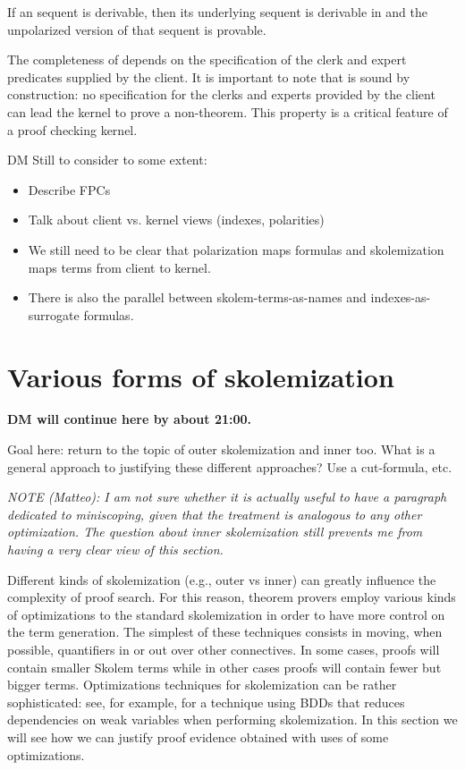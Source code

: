 \documentclass[a4paper,USenglish]{lipics-v2018}
\begin{document}
{\begin{theorem}
  If an \LKFa sequent is derivable, then its underlying sequent is
  derivable in \LKF and the unpolarized version of that sequent is \LK
  provable.
\end{theorem}

\noindent%
The completeness of \LKFa
depends on the specification of the clerk and expert predicates
supplied by the client.
%
It is important to note that \LKFa is sound by construction: no
  specification for the clerks and experts provided by the
  client can lead the kernel to prove a non-theorem.
%
This property is a critical feature of a proof checking kernel.

{\color{red}DM Still to consider to some extent:
  \begin{itemize}
  \item Describe FPCs
  \item Talk about client vs. kernel views (indexes, polarities)
   \item We still need to be clear that polarization maps formulas and
     skolemization maps terms from client to kernel.
     \item There is also the parallel between skolem-terms-as-names
       and indexes-as-surrogate formulas.
  \end{itemize}
}


\section{Various forms of skolemization}
\label{sec:deskolem}

{\color{red}\bf DM will continue here by about 21:00.}

{\color{red}
  Goal here: return to the topic of outer skolemization and inner too.
  What is a general approach to justifying these different approaches?
  Use a cut-formula, etc.
  }

\emph{NOTE (Matteo): I am not sure whether it is actually useful to
have a paragraph dedicated to miniscoping, given that the treatment is
analogous to any other optimization. The question about inner
skolemization still prevents me from having a very clear view of this
section.}

Different kinds of skolemization (e.g., outer vs inner) can greatly
influence the complexity of proof search.
%
For this reason, theorem provers employ various kinds of optimizations
to the standard skolemization in order to have more control on the
term generation.
%
The simplest of these techniques consists in moving, when possible,
quantifiers in or out over other connectives.
%
In some cases, proofs will contain smaller Skolem terms while in other
cases proofs will contain fewer but bigger terms.
%
Optimizations techniques for skolemization can be rather
sophisticated: see, for example, \cite{goubault95jiglp} for a
technique using BDDs that reduces dependencies on weak variables when
performing skolemization.
%
In this section we will see how we can justify proof evidence obtained
with uses of some optimizations.

}
\end{document}
